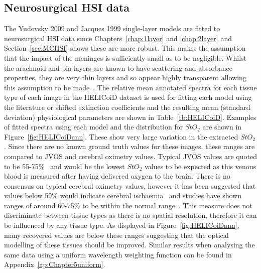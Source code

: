 \subsection{Neurosurgical HSI data}
The Yudovsky 2009 and Jacques 1999 single-layer models are fitted to neurosurgical HSI data since Chapters~\ref{chap:1layer} and \ref{chap:2layer} and Section~\ref{sec:MCHSI} shows these are more robust.
This makes the assumption that the impact of the meninges is sufficiently small as to be negligible. Whilst the arachnoid and pia layers are known to have scattering and absorbance properties, they are very thin layers and so appear highly transparent allowing this assumption to be made~\citep{Ghannam2023}.
The relative mean annotated spectra for each tissue type of each image in the HELICoiD dataset is used for fitting each model using the literature or shifted extinction coefficients and the resulting mean (standard deviation) physiological parameters are shown in Table~\ref{tb:HELICoiD}. Examples of fitted spectra using each model and the distribution for $StO_2$ are shown in Figure~\ref{fig:HELICoiDann}. These show very large variation in the extracted $StO_2$. Since there are no known ground truth values for these images, these ranges are compared to JVOS and cerebral oximetry values. Typical JVOS values are quoted to be 55-75\%~\citep{Raith2020, Zhong2021} and would be the lowest $StO_2$ values to be expected as this venous blood is measured after having delivered oxygen to the brain. There is no consensus on typical cerebral oximetry values, however it has been suggested that values below 59\% would indicate cerebral ischaemia~\citep{Zhong2021} and studies have shown ranges of around 60-75\% to be within the normal range~\citep{Lian2020}. This measure does not discriminate between tissue types as there is no spatial resolution, therefore it can be influenced by any tissue type. As displayed in Figure~\ref{fig:HELICoiDann}, many recovered values are below these ranges suggesting that the optical modelling of these tissues should be improved. Similar results when analysing the same data using a uniform wavelength weighting function can be found in Appendix~\ref{ap:Chapter5uniform}.

